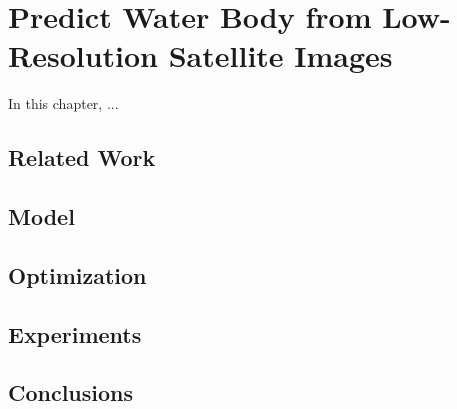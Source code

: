\chapter{Predict Water Body from Low-Resolution Satellite Images}
\label{chap-4-predict-water-body}
\begin{ChapAbstract}
In this chapter, ...
\end{ChapAbstract}

\section{Related Work}

\section{Model}

\section{Optimization}

\section{Experiments}

\section{Conclusions}

